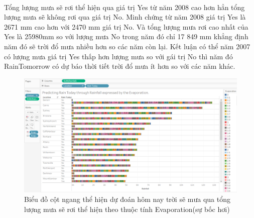 \documentclass{article}
\begin{document}
\paragraph{}Tổng lượng mưa sẽ rơi thể hiện qua giá trị Yes từ năm 2008 cao hơn hẳn tổng lượng mưa sẽ không rơi qua giá trị No. Minh chứng từ năm 2008 giá trị Yes là 2671 mm cao hơn với 2470 mm giá trị No. Và tổng lượng mưa rơi cao nhất của Yes là 25980mm so với lượng mưa No trong năm đó chỉ 17 849 mm khẳng định năm đó sẽ trời đổ mưa nhiều hơn so các năm còn lại. Kết luận có thể năm 2007 có lượng mưa giá trị Yes thấp hơn lượng mưa so với gái trị No thì năm đó RainTomorrow có dự báo thời tiết trời đổ mưa ít hơn so với các năm khác.
\pagebreak{}
\begin{figure}[!h]
	\begin{center}
		\includegraphics[width=\linewidth]{images/tableau3.png}
		\caption{\fontsize{14}{20}\selectfont Biểu đồ cột ngang thể hiện dự đoán hôm nay trời sẽ mưa qua tổng lượng mưa sẽ rơi thể hiện theo thuộc tính Evaporation(sự bốc hơi)}
	\end{center}
\end{figure}
\end{document}
